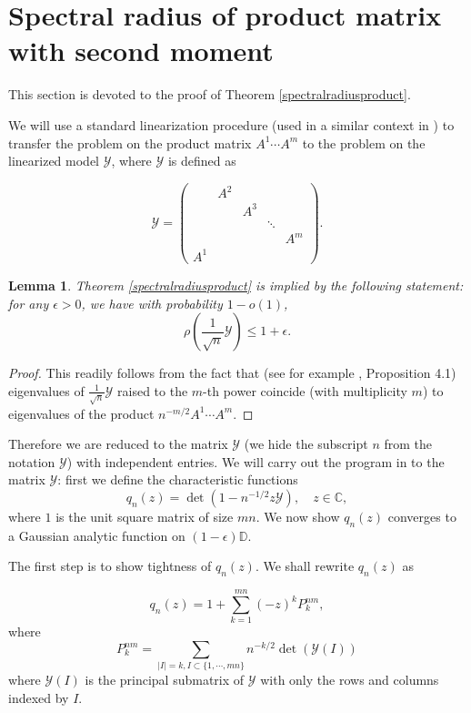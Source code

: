 \documentclass[12pt, reqno]{amsart}
\newtheorem{lemma}[theorem]{Lemma}
\theoremstyle{definition}
\theoremstyle{remark}
\numberwithin{equation}{section}
\begin{document}
\section{Spectral radius of product matrix with second moment}

This section is devoted to the proof of Theorem \ref{spectralradiusproduct}.

We will use a standard linearization procedure (used in a similar context in \cite{MR4076784}) to transfer the problem on the product matrix $A^1\cdots A^m$ to the problem on the linearized model $\mathcal{Y}$, where $\mathcal{Y}$ is defined as

\begin{equation}\label{welinearizeit}
\mathcal{Y}=\begin{pmatrix}
&A^2&&&\\&&A^3&&\\&&&\ddots&\\&&&&A^m\\A^1&&&&
\end{pmatrix}.\end{equation}

\begin{lemma}\label{theorem2.1345}
    Theorem \ref{spectralradiusproduct} is implied by the following statement: for any $\epsilon>0$, we have with probability $1-o(1)$, 
    $$\rho(\frac{1}{\sqrt{n}}\mathcal{Y})\leq 1+\epsilon.$$
\end{lemma}

\begin{proof}
    This readily follows from the fact that (see for example \cite{MR4076784}, Proposition 4.1) eigenvalues of $\frac{1}{\sqrt{n}}\mathcal{Y}$ raised to the $m$-th power coincide (with multiplicity $m$) to eigenvalues of the product $n^{-m/2}A^1\cdots A^m$.
\end{proof}

Therefore we are reduced to the matrix $\mathcal{Y}$ (we hide the subscript $n$ from the notation $\mathcal{Y}$) with independent entries. We will carry out the program in \cite{bordenave2021convergence} to the matrix $\mathcal{Y}$: first we define the characteristic functions 
$$
q_n(z)=\det(1-n^{-1/2}z\mathcal{Y}),\quad z\in\mathbb{C},
$$where $1$ is the unit square matrix of size $mn$. We now show $q_n(z)$ converges to a Gaussian analytic function on $(1-\epsilon)\mathbb{D}$.


The first step is to show tightness of $q_n(z)$. We shall rewrite $q_n(z)$ as

$$
q_n(z)=1+\sum_{k=1}^{mn}(-z)^k P_k^{nm},
$$
where 
$$
P_k^{nm}=\sum_{|I|=k,I\subset\{1,\cdots,mn\}}n^{-k/2}\det(\mathcal{Y}(I))
$$ where $\mathcal{Y}(I)$ is the principal submatrix of $\mathcal{Y}$ with only the rows and columns indexed by $I$.
\end{document}
